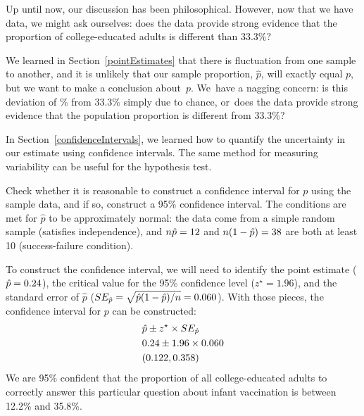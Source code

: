 Up until now, our discussion has been philosophical.
However, now that we have data, we might ask ourselves:
does the data provide strong evidence that the proportion
of college-educated adults is different than 33.3\%?

We learned in Section~\ref{pointEstimates} that there is
fluctuation from one sample to another, and it is unlikely
that our sample proportion, $\hat{p}$,
will exactly equal $p$, but we want to make
a conclusion about~$p$.
We~have a nagging concern:
is this deviation of \roslingApercent{}\%
from 33.3\% simply due to chance,
or~does the data provide strong evidence that the
population proportion is different from 33.3\%?

In Section~\ref{confidenceIntervals}, we learned how to
quantify the uncertainty in our estimate using confidence
intervals. 
The same method for measuring variability can be useful
for the hypothesis test.

\begin{examplewrap}
\begin{nexample}{Check whether it is reasonable to construct
    a confidence interval for $p$ using the sample data, and
    if so, construct a 95\% confidence interval.}
  The conditions are met for $\hat{p}$ to be approximately
  normal: the data come from a simple random sample (satisfies
  independence), and $n\hat{p} = 12$ and
  $n(1 - \hat{p}) = 38$ are both
  at least 10 (success-failure condition).

  To construct the confidence interval, we will need to identify
  the point estimate ($\hat{p} = 0.24$),
  the critical value for
  the 95\% confidence level ($z^{\star} = 1.96$), and the standard
  error of $\hat{p}$
  ($SE_{\hat{p}} = \sqrt{\hat{p}(1 - \hat{p}) / n} = 0.060$).
  With those pieces, the confidence interval for $p$ can be
  constructed:
  \begin{align*}
    &\hat{p} \pm z^{\star} \times SE_{\hat{p}} \\
    &0.24 \pm 1.96 \times 0.060 \\
    &(0.122, 0.358)
  \end{align*}
  We are 95\% confident that the proportion of all
  college-educated adults to correctly answer this
  particular question about infant vaccination is between
  12.2\% and 35.8\%.
\end{nexample}
\end{examplewrap}

